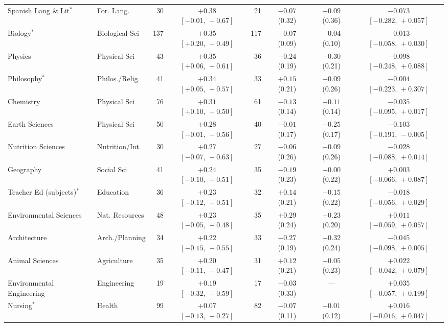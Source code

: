 \documentclass[11pt]{article}
\begin{document}
{\begin{longtable}{@{}>{\raggedright\arraybackslash}p{3.2cm}>{\raggedright\arraybackslash}p{1.9cm}rcrccc@{}}
Spanish Lang \& Lit$^{*}$ & For. Lang. & 30 & ${+}0.38$ $[{-}0.01,\,{+}0.67]$ & 21 & ${-}0.07$ (0.32) & ${+}0.09$ (0.36) & ${-}0.073$ $[{-}0.282,\,{+}0.057]$ \\
Biology$^{*}$ & Biological Sci & 137 & ${+}0.35$ $[{+}0.20,\,{+}0.49]$ & 117 & ${-}0.07$ (0.09) & ${-}0.04$ (0.10) & ${-}0.013$ $[{-}0.058,\,{+}0.030]$ \\
Physics & Physical Sci & 43 & ${+}0.35$ $[{+}0.06,\,{+}0.61]$ & 36 & ${-}0.24$ (0.19) & ${-}0.30$ (0.21) & ${-}0.098$ $[{-}0.248,\,{+}0.088]$ \\
Philosophy$^{*}$ & Philos./\allowbreak Relig. & 41 & ${+}0.34$ $[{+}0.05,\,{+}0.57]$ & 33 & ${+}0.15$ (0.21) & ${+}0.09$ (0.26) & ${-}0.004$ $[{-}0.223,\,{+}0.307]$ \\
Chemistry & Physical Sci & 76 & ${+}0.31$ $[{+}0.10,\,{+}0.50]$ & 61 & ${-}0.13$ (0.14) & ${-}0.11$ (0.14) & ${-}0.035$ $[{-}0.095,\,{+}0.017]$ \\
Earth Sciences & Physical Sci & 50 & ${+}0.28$ $[{-}0.01,\,{+}0.56]$ & 40 & ${-}0.01$ (0.17) & ${-}0.25$ (0.17) & ${-}0.103$ $[{-}0.191,\,{-}0.005]$ \\
Nutrition Sciences & Nutrition/\allowbreak Int. & 30 & ${+}0.27$ $[{-}0.07,\,{+}0.63]$ & 27 & ${-}0.06$ (0.26) & ${-}0.09$ (0.26) & ${-}0.028$ $[{-}0.088,\,{+}0.014]$ \\
Geography & Social Sci & 41 & ${+}0.24$ $[{-}0.10,\,{+}0.51]$ & 35 & ${-}0.19$ (0.23) & ${+}0.00$ (0.22) & ${+}0.003$ $[{-}0.066,\,{+}0.087]$ \\
Teacher Ed (subjects)$^{*}$ & Education & 36 & ${+}0.23$ $[{-}0.12,\,{+}0.51]$ & 32 & ${+}0.14$ (0.21) & ${-}0.15$ (0.22) & ${-}0.018$ $[{-}0.056,\,{+}0.029]$ \\
Environmental Sciences & Nat. Resources & 48 & ${+}0.23$ $[{-}0.05,\,{+}0.48]$ & 35 & ${+}0.29$ (0.24) & ${+}0.23$ (0.20) & ${+}0.011$ $[{-}0.059,\,{+}0.057]$ \\
Architecture & Arch./\allowbreak Planning & 34 & ${+}0.22$ $[{-}0.15,\,{+}0.55]$ & 33 & ${-}0.27$ (0.19) & ${-}0.32$ (0.24) & ${-}0.045$ $[{-}0.098,\,{+}0.005]$ \\
Animal Sciences & Agriculture & 35 & ${+}0.20$ $[{-}0.11,\,{+}0.47]$ & 31 & ${+}0.12$ (0.21) & ${+}0.05$ (0.23) & ${+}0.022$ $[{-}0.042,\,{+}0.079]$ \\
Environmental Engineering & Engineering & 19 & ${+}0.19$ $[{-}0.32,\,{+}0.59]$ & 17 & ${-}0.03$ (0.33) & --- & ${+}0.035$ $[{-}0.057,\,{+}0.199]$ \\
Nursing$^{*}$ & Health & 99 & ${+}0.07$ $[{-}0.13,\,{+}0.27]$ & 82 & ${-}0.07$ (0.11) & ${-}0.01$ (0.12) & ${+}0.016$ $[{-}0.016,\,{+}0.047]$ \\

\end{longtable}}
\end{document}
